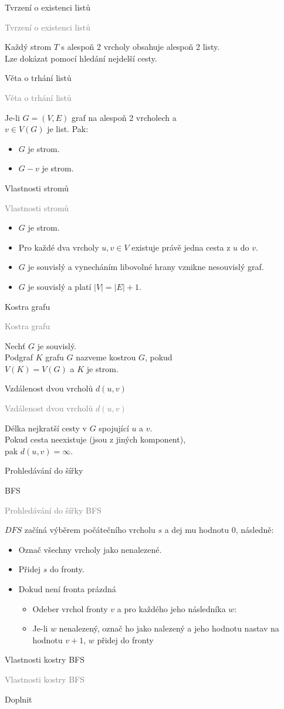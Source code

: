 \documentclass[20pt]{extarticle}
\newcommand{\card}[3][]{
	\vspace*{\fill}

	\newpage
	\topskip0pt
	\vspace*{\fill}
		\Large #2

		\vspace{1cm}
		\normalsize #1
	\vspace*{\fill}
	\newpage

	\small \textcolor{gray}{#2 #1}
	\topskip0pt
	\vspace*{\fill}

	\normalsize
	#3
	\vspace*{\fill}
}
\newcommand{\pair}[2]{\left(#1, #2\right)}
\newcommand{\graph}{G=\pair{V}{E}}
\newcommand{\vertexes}[1][G]{V(#1)}
\begin{document}
\begin{center}
\card{Tvrzení o existenci listů}{
	Každý strom $T$ s alespoň 2 vrcholy obsahuje alespoň 2 listy.\\
	Lze dokázat pomocí hledání nejdelší cesty.
}

\card{Věta o trhání listů}{
	Je-li $\graph$ graf na alespoň 2 vrcholech a\\
	$v \in \vertexes$ je list. Pak:
	\begin{itemize}
		\item $G$ je strom.
		\item $G - v$ je strom.
	\end{itemize}
}

\card{Vlastnosti stromů}{
	\begin{itemize}
		\item $G$ je strom.
		\item Pro každé dva vrcholy $u,v \in V$ existuje právě jedna cesta z $u$ do $v$.
		\item $G$ je souvislý a vynecháním libovolné hrany vznikne nesouvislý graf.
		\item $G$ je souvislý a platí $|V|=|E|+1$.
	\end{itemize}
}

\card{Kostra grafu}{
	Nechť $G$ je souvislý.\\
	Podgraf $K$ grafu $G$ nazveme kostrou $G$, pokud\\
	$\vertexes[K]=\vertexes[G]$ a $K$ je strom.
}

\card{Vzdálenost dvou vrcholů $d\pair{u}{v}$}{
	Délka nejkratší cesty v $G$ spojující $u$ a $v$.\\ Pokud cesta neexistuje (jsou z jiných komponent),\\
	pak $d\pair{u}{v}=\infty$.
}

\card[BFS]{Prohledávání do šířky}{
    \small
	$DFS$ začíná výběrem počátečního vrcholu $s$ a dej mu hodnotu 0, následně:
	\begin{itemize}
		\item Označ všechny vrcholy jako nenalezené.
		\item Přidej $s$ do fronty.
		\item Dokud není fronta prázdná
		\begin{itemize}
			\item Odeber vrchol fronty $v$ a pro každého jeho následníka $w$:
			\item Je-li $w$ nenalezený, označ ho jako nalezený a jeho hodnotu nastav na hodnotu $v + 1$, $w$ přidej do fronty
		\end{itemize}
	\end{itemize}
	\normalsize
}

\card{Vlastnosti kostry BFS}{
	Doplnit
}

\end{center}
\end{document}
